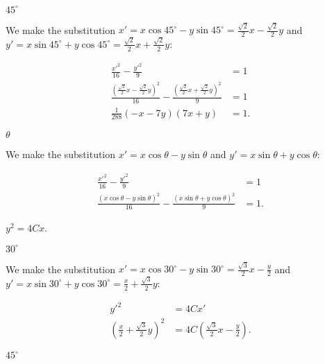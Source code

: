 \documentclass[../gatm_answers.tex]{subfiles}
\begin{document}
\begin{iinner_problem}
\item $45^\circ$
\end{iinner_problem}

\noindent We make the substitution $x'=x \cos 45^\circ - y\sin 45^\circ=\frac{\sqrt{2}}{2}x-\frac{\sqrt{2}}{2}y$ and $y'=x\sin 45^\circ + y\cos 45^\circ=\frac{\sqrt{2}}{2}x+\frac{\sqrt{2}}{2}y$:

\begin{align*}
\frac{x'^2}{16}-\frac{y'^2}{9} &= 1 \\
\frac{\left(\frac{\sqrt{2}}{2}x-\frac{\sqrt{2}}{2}y\right)^2}{16} - \frac{\left(\frac{\sqrt{2}}{2}x+\frac{\sqrt{2}}{2}y\right)^2}{9} &= 1 \\
\frac{1}{288} (-x - 7 y) (7 x + y) &= 1.
\end{align*}

\begin{iinner_problem}
\item $\theta$
\end{iinner_problem}

\noindent We make the substitution $x'=x \cos \theta - y\sin \theta$ and $y'=x\sin \theta + y\cos \theta$:

\begin{align*}
\frac{x'^2}{16}-\frac{y'^2}{9} &= 1 \\
\frac{\left(x \cos \theta - y\sin \theta\right)^2}{16} - \frac{\left(x\sin \theta + y\cos \theta\right)^2}{9} &= 1.
\end{align*}

\begin{inner_problem}
\item $y^2=4Cx$.
\end{inner_problem}

\begin{iinner_problem}[start=1]
\item $30^\circ$
\end{iinner_problem}

\noindent We make the substitution $x'=x \cos 30^\circ - y\sin 30^\circ=\frac{\sqrt{3}}{2}x-\frac{y}{2}$ and $y'=x\sin 30^\circ + y\cos 30^\circ=\frac{x}{2}+\frac{\sqrt{3}}{2}y$:

\begin{align*}
y'^2&=4Cx' \\
\left(\frac{x}{2}+\frac{\sqrt{3}}{2}y\right)^2 &= 4C\left(\frac{\sqrt{3}}{2}x-\frac{y}{2}\right).
\end{align*}

\begin{iinner_problem}
\item $45^\circ$
\end{iinner_problem}
\end{document}

